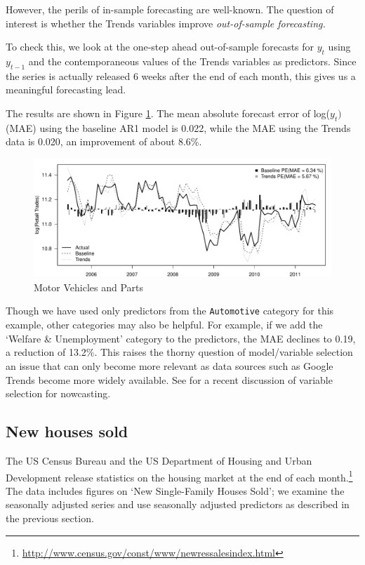\documentclass[12pt, oneside]{article}
\begin{document}
However, the perils of in-sample forecasting are well-known.  The
question of interest is whether the Trends variables improve
{\it out-of-sample forecasting.}

To check this, we look at the one-step ahead out-of-sample forecasts
for $y_t$ using $y_{t-1}$ and the contemporaneous values of the Trends
variables as predictors.  Since the series is actually released 6
weeks after the end of each month, this gives us a meaningful
forecasting lead.

The results are shown in Figure \ref{Fig:autos}.  The mean absolute
forecast error of log($y_t)$ (MAE) using the baseline AR1 model is
0.022, while the MAE using the Trends data is 0.020, an improvement of
about 8.6\%.

\begin{figure}[ht]
\begin{center}
\includegraphics[width= 6.5in]{autos}
\caption{\label{Fig:autos} Motor Vehicles and Parts} 
\end{center}
\end{figure}

Though we have used only predictors from the {\tt Automotive} category
for this example, other categories may also be helpful.  For example,
if we add the `Welfare \& Unemployment' category to the predictors,
the MAE declines to 0.19, a reduction of 13.2\%.   This raises the
thorny question of model/variable selection an issue that can only
become more relevant as data sources such as Google Trends become more
widely available.  See \cite{Castle10} for a recent discussion of
variable selection for nowcasting.

\subsection{New houses sold}

The US Census Bureau and the US Department of Housing and Urban
Development release statistics on the housing market at the end of
each
month.\footnote{\url{http://www.census.gov/const/www/newressalesindex.html}}
The data includes figures on `New Single-Family Houses Sold'; we examine
the seasonally adjusted series and use seasonally adjusted predictors
as described in the previous section.
\end{document}
